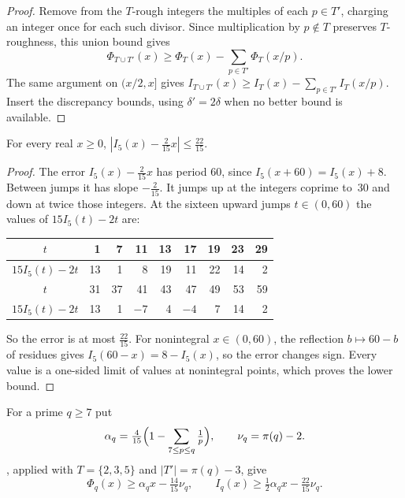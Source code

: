 \begin{proof}
Remove from the $T$-rough integers the multiples of each $p\in T'$, charging an integer once for each such divisor. Since multiplication by $p\notin T$ preserves $T$-roughness, this union bound gives
\[
 \Phi_{T\cup T'}(x)\ge\Phi_T(x)-\sum_{p\in T'}\Phi_T(x/p).
\]
The same argument on $(x/2,x]$ gives $I_{T\cup T'}(x)\ge I_T(x)-\sum_{p\in T'}I_T(x/p)$. Insert the discrepancy bounds, using $\delta'=2\delta$ when no better bound is available.
\end{proof}

\begin{lemma}\label{lem:half}
For every real $x\ge0$, $|I_5(x)-\frac2{15}x|\le\frac{22}{15}$.
\end{lemma}

\begin{proof}
The error $I_5(x)-\frac{2}{15}x$ has period $60$, since $I_5(x+60)=I_5(x)+8$. Between jumps it has slope $-\frac2{15}$. It jumps up at the integers coprime to~$30$ and down at twice those integers. At the sixteen upward jumps $t\in(0,60)$ the values of $15I_5(t)-2t$ are:

\smallskip
\begin{center}\small
\begin{tabular}{c|rrrrrrrr}
$t$&1&7&11&13&17&19&23&29\\\hline
$15I_5(t)-2t$&13&1&8&19&11&22&14&2\\[2pt]
$t$&31&37&41&43&47&49&53&59\\\hline
$15I_5(t)-2t$&13&1&$-7$&4&$-4$&7&14&2
\end{tabular}
\end{center}
\smallskip

So the error is at most $\frac{22}{15}$. For nonintegral $x\in(0,60)$, the reflection $b\mapsto60-b$ of residues gives $I_5(60-x)=8-I_5(x)$, so the error changes sign. Every value is a one-sided limit of values at nonintegral points, which proves the lower bound.
\end{proof}

For a prime $q\ge7$ put
\[
 \alpha_q=\tfrac4{15}\Bigl(1-\sum_{7\le p\le q}\tfrac1p\Bigr),\qquad \nu_q=\pi(q)-2 .
\]
, applied with $T=\{2,3,5\}$ and $|T'|=\pi(q)-3$, give
\begin{equation}\label{eq:alpha-sieve}
 \Phi_q(x)\ge\alpha_qx-\tfrac{14}{15}\nu_q,\qquad I_q(x)\ge\tfrac12\alpha_qx-\tfrac{22}{15}\nu_q .
\end{equation}

